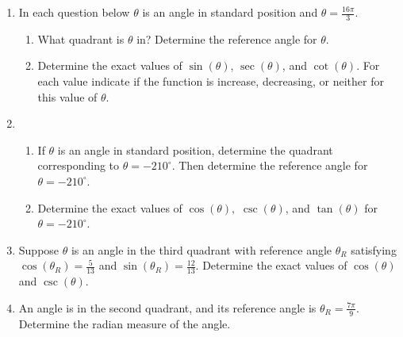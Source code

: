 \begin{enumerate}
\item In each question below  $\theta$ is an angle in standard
  position and  $\theta=\frac{16\pi}{3}$. 
  \begin{enumerate}
  \item What quadrant is $\theta$ in?  Determine the reference angle
    for $\theta$.
    \vfill
    \vfill

  \item Determine the exact values of $\sin(\theta)$, $\sec(\theta)$,
    and $\cot(\theta)$. For each value indicate if the function is
    increase, decreasing, or neither for this value of $\theta$.
    \vfill \vfill \vfill \vfill
\end{enumerate}

\clearpage
\item \begin{enumerate}
  \item If $\theta$ is an angle in standard position, determine the
    quadrant corresponding to $\theta=-210^\circ$. Then determine the
    reference angle for $\theta=-210^\circ$.

    \vfill

  \item Determine the exact values of $\cos(\theta),$ $\csc(\theta)$,
    and $\tan(\theta)$ for $\theta=-210^\circ$.

    \vfill
    
\end{enumerate}








\item Suppose $\theta$ is an angle in the third quadrant with
  reference angle $\theta_R$ satisfying $\cos(\theta_R)=\frac{5}{13}$
  and $\sin(\theta_R)=\frac{12}{13}$.  Determine the exact values of
  $\cos(\theta)$ and $\csc(\theta)$.

  \vfill
  \vfill
  \vfill

\item An angle is in the second quadrant, and its reference angle is
  $\theta_R=\frac{7\pi}{9}$. Determine the radian measure of the
  angle.

  \vfill

\end{enumerate}




